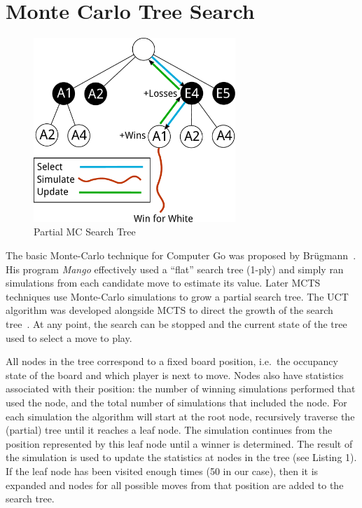 \documentclass{acm_proc_article-sp}
\begin{document}
\section{Monte Carlo Tree Search} \label{mcts}

\begin{figure}
	\begin{center}
	\includegraphics[width=3.0in]{graphics/tree.pdf}
	\end{center}
	\caption{Partial MC Search Tree}
	\label{fig:tree}
\end{figure}

The basic Monte-Carlo technique for Computer Go was proposed by Br\"{u}gmann~\cite{brugmann1993monte}. His program \emph{Mango} effectively used a ``flat'' search tree (1-ply) and simply ran simulations from each candidate move to estimate its value. 
Later MCTS techniques use Monte-Carlo simulations to grow a partial search tree. 
The UCT algorithm was developed alongside MCTS to direct the growth of the search tree~\cite{gelly2006exploration}. 
At any point, the search can be stopped and the current state of the tree used to select a move to play. 

All nodes in the tree correspond to a fixed board position, i.e.~the occupancy state of the board and which player is next to move. 
Nodes also have statistics associated with their position:  the number of winning simulations performed that used the node, and the total number of simulations that included the node. 
For each simulation the algorithm will start at the root node, recursively traverse the (partial) tree until it reaches a leaf node.
The simulation continues from the position represented by this leaf node until a winner is determined.
The result of the simulation is used to update the statistics at nodes in the tree
(see Listing 1).
If the leaf node has been visited enough times (50 in our case), then it is expanded and nodes for all possible moves from 
that position are added to the search tree.
\end{document}
